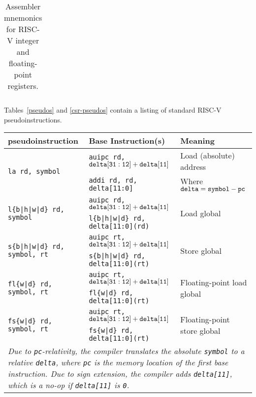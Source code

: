 \begin{table*}[htbp]
\begin{center}
\begin{tabular}{|l|l|l|l|}
 \end{tabular}
\end{center}
\caption{Assembler mnemonics for RISC-V integer and floating-point registers.}
\label{regmap}
\end{table*}

Tables~\ref{pseudos} and \ref{csr-pseudos} contain a listing of standard
RISC-V pseudoinstructions.

\begin{table}[h]
\begin{small}
\begin{center}
\begin{tabular}{l l l}
pseudoinstruction & Base Instruction(s) & Meaning \\ \hline

\multirow{2}{*}{\tt la rd, symbol} & {\tt auipc rd, ${\tt delta[31:12]} + {\tt delta[11]}$} & Load (absolute) address \\
                                   & {\tt addi rd, rd, delta[11:0]}                         & Where ${\tt delta} = {\tt symbol} - {\tt pc}$\\
\multirow{2}{*}{\tt l\{b|h|w|d\} rd, symbol} & {\tt auipc rd, ${\tt delta[31:12]} + {\tt delta[11]}$} & \multirow{2}{*}{Load global} \\
                                             & {\tt l\{b|h|w|d\} rd, delta[11:0](rd)} \\
\multirow{2}{*}{\tt s\{b|h|w|d\} rd, symbol, rt} & {\tt auipc rt, ${\tt delta[31:12]} + {\tt delta[11]}$} & \multirow{2}{*}{Store global} \\
                                                 & {\tt s\{b|h|w|d\} rd, delta[11:0](rt)} \\
\multirow{2}{*}{\tt fl\{w|d\} rd, symbol, rt} & {\tt auipc rt, ${\tt delta[31:12]} + {\tt delta[11]}$} & \multirow{2}{*}{Floating-point load global} \\
                                              & {\tt fl\{w|d\} rd, delta[11:0](rt)} \\
\multirow{2}{*}{\tt fs\{w|d\} rd, symbol, rt} & {\tt auipc rt, ${\tt delta[31:12]} + {\tt delta[11]}$} & \multirow{2}{*}{Floating-point store global} \\
                                              & {\tt fs\{w|d\} rd, delta[11:0](rt)} \\
\multicolumn{3}{p{.99\textwidth}}{\small \em Due to {\tt pc}-relativity, the compiler translates the absolute {\tt symbol} to a relative {\tt delta}, where {\tt pc} is the memory location of the first base instruction. Due to sign extension, the compiler adds {\tt delta[11]}, which is a no-op if {\tt delta[11]} is {\tt 0}.} \\

\end{tabular}
\end{center}
\end{small}
\end{table}
